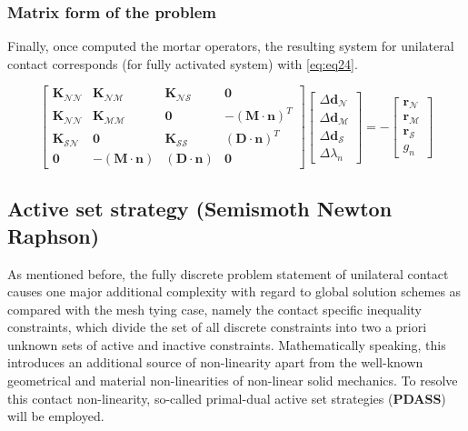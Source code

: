 \documentclass[a4paper,10pt]{article} %
\begin{document}
\subsubsection{Matrix form of the problem}


Finally, once computed the mortar operators, the resulting system for unilateral contact corresponds (for fully activated system) with \eqref{eq:eq24}.

\begin{equation}\label{eq:eq24}
    \left[ \begin{array}{cccc} \mathbf{K}_{\mathcal{N}\mathcal{N}} &  \mathbf{K}_{\mathcal{N}\mathcal{M}} & \mathbf{K}_{\mathcal{N}\mathcal{S}} & \mathbf{0} \\ \mathbf{K}_{\mathcal{N}\mathcal{N}}  & \mathbf{K}_{\mathcal{M}\mathcal{M}} & \mathbf{0} & -(\mathbf{M}\cdot \mathbf{n})^{T} \\ \mathbf{K}_{\mathcal{S}\mathcal{N}} & \mathbf{0} & \mathbf{K}_{\mathcal{S}\mathcal{S}} & (\mathbf{D}\cdot \mathbf{n})^T \\ \mathbf{0} & -(\mathbf{M}\cdot \mathbf{n}) & (\mathbf{D}\cdot \mathbf{n}) & \mathbf{0}   \end{array} \right] \left[ \begin{array}{c} \Delta\mathbf{d}_{\mathcal{N}} \\ \Delta\mathbf{d}_{\mathcal{M}} \\ \Delta\mathbf{d}_{\mathcal{S}} \\ \Delta\lambda_n \end{array} \right] = - \left[ \begin{array}{c} \mathbf{r}_{\mathcal{N}} \\ \mathbf{r}_{\mathcal{M}} \\ \mathbf{r}_{\mathcal{S}} \\ g_n \end{array} \right] 
\end{equation}

\subsection{Active set strategy (Semismoth Newton Raphson)}

As mentioned before, the fully discrete problem statement of unilateral contact causes one major additional complexity with regard to global solution schemes as compared with the mesh tying case, namely the contact specific inequality constraints, which divide the set of all discrete constraints into two a priori unknown sets of active and inactive constraints. Mathematically speaking, this introduces an additional source of non-linearity apart from the well-known geometrical and material non-linearities of non-linear solid mechanics. To resolve this contact non-linearity, so-called primal-dual active set strategies (\textbf{PDASS}) will be employed.
\end{document}
